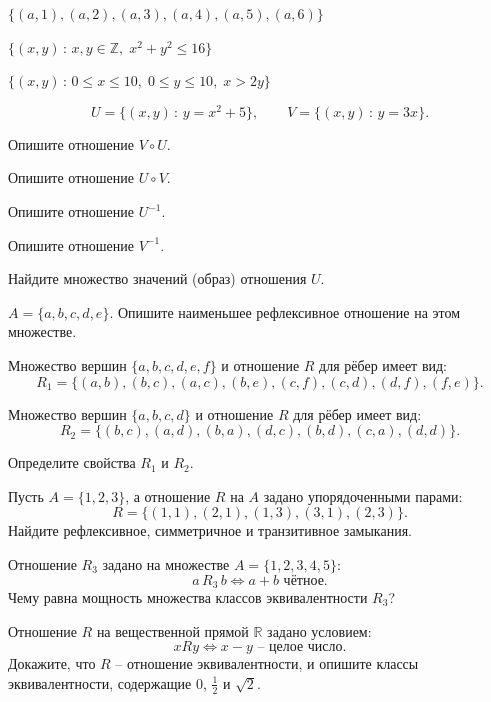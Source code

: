 \documentclass[a4paper,12pt,oneside]{article}
\begin{document}

\begin{alphlist}
  \item $\bigl\{(a,1),(a,2),(a,3),(a,4),(a,5),(a,6)\bigr\}$
  \item $\bigl\{(x,y)\,:\,x,y\in\mathbb{Z},\;x^2+y^2\le 16\bigr\}$
  \item $\bigl\{(x,y)\,:\,0\le x\le 10,\;0\le y\le 10,\;x>2y\bigr\}$
\end{alphlist}

\[
U=\bigl\{(x,y)\,:\,y=x^2+5\bigr\},
\qquad
V=\bigl\{(x,y)\,:\,y=3x\bigr\}.
\]
\begin{alphlist}
  \item Опишите отношение $V\circ U$.
  \item Опишите отношение $U\circ V$.
  \item Опишите отношение $U^{-1}$.
  \item Опишите отношение $V^{-1}$.
  \item Найдите множество значений (образ) отношения $U$.
\end{alphlist}

$A=\{a,b,c,d,e\}$. Опишите наименьшее рефлексивное отношение на этом множестве.

\begin{numlist}
  \item Множество вершин $\{a,b,c,d,e,f\}$ и отношение $R$ для рёбер имеет вид:
  \[
    R_1=\bigl\{(a,b),(b,c),(a,c),(b,e),(c,f),(c,d),(d,f),(f,e)\bigr\}.
  \]

  \item Множество вершин $\{a,b,c,d\}$ и отношение $R$ для рёбер имеет вид:
  \[
    R_2=\bigl\{(b,c),(a,d),(b,a),(d,c),(b,d),(c,a),(d,d)\bigr\}.
  \]

  \item Определите свойства $R_1$ и $R_2$.
\end{numlist}

Пусть $A=\{1,2,3\}$, а отношение $R$ на $A$ задано упорядоченными парами:
\[
R=\bigl\{(1,1),(2,1),(1,3),(3,1),(2,3)\bigr\}.
\]
Найдите рефлексивное, симметричное и транзитивное замыкания.

Отношение $R_3$ задано на множестве $A=\{1,2,3,4,5\}$:
\[
a\,R_3\,b \iff a+b \text{ чётное}.
\]
Чему равна мощность множества классов эквивалентности $R_3$?

Отношение $R$ на вещественной прямой $\mathbb{R}$ задано условием:
\[
xRy \iff x-y \text{ – целое число}.
\]
Докажите, что $R$ – отношение эквивалентности, и опишите классы эквивалентности,
содержащие $0$, $\tfrac{1}{2}$ и $\sqrt{2}$.
\end{document}
